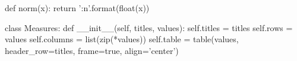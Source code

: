 \begin{sagesilent}
    def norm(x):
        return '{:n}'.format(float(x))
    
    class Measures:
        def __init__(self, titles, values):
            self.titles = titles
            self.rows = values
            self.columns = list(zip(*values))
            self.table = table(values, header_row=titles, frame=true, align='center')
\end{sagesilent}